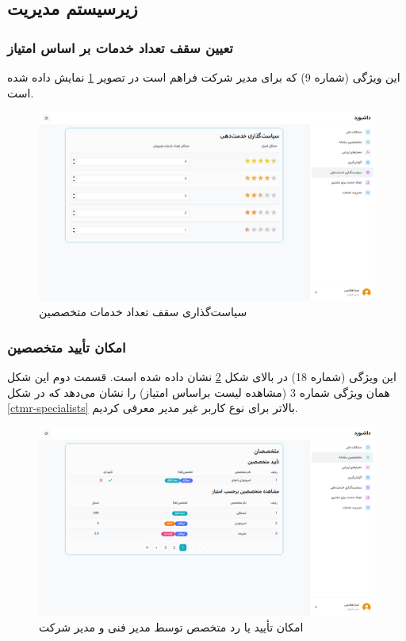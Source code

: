 \subsection{زیرسیستم مدیریت}

\subsubsection{تعیین سقف تعداد خدمات بر اساس امتیاز}
این ویژگی (شماره 9) که برای مدیر شرکت فراهم است در تصویر
\ref{policy}
نمایش داده شده است.

\begin{figure}[h]
	\centering
	\includegraphics[width=\textwidth]{figs/initial-ui/service-policy}
	\caption{سیاست‌گذاری سقف تعداد خدمات متخصصین}
	\label{policy}
\end{figure}


\subsubsection{امکان تأیید متخصصین}
این ویژگی (شماره 18) در بالای شکل
\ref{mngr-specialists}
نشان داده شده است. قسمت دوم این شکل همان ویژگی شماره 3 (مشاهده لیست براساس امتیاز) را نشان می‌دهد که در شکل
\ref{ctmr-specialists}
بالاتر برای نوع کاربر غیر مدیر معرفی کردیم.

\begin{figure}[h]
	\centering
	\includegraphics[width=\textwidth]{figs/initial-ui/mngr-specialists}
	\caption{امکان تأیید یا رد متخصص توسط مدیر فنی و مدیر شرکت}
	\label{mngr-specialists}
\end{figure}

